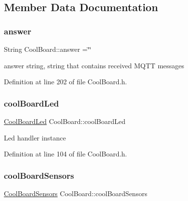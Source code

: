 \subsection{Member Data Documentation}
\mbox{\label{class_cool_board_a7b835fafd449e5282f7f91d787a2dc15}} 
\subsubsection{\texorpdfstring{answer}{answer}}
{\footnotesize\ttfamily String Cool\+Board\+::answer =\char`\"{}\char`\"{}\hspace{0.3cm}{\ttfamily [private]}}

answer string, string that contains received M\+Q\+TT messages 

Definition at line 202 of file Cool\+Board.\+h.

\mbox{\label{class_cool_board_a1b1d3c684a5baa56b08486e192fd8e97}} 
\subsubsection{\texorpdfstring{cool\+Board\+Led}{coolBoardLed}}
{\footnotesize\ttfamily \hyperlink{class_cool_board_led}{Cool\+Board\+Led} Cool\+Board\+::cool\+Board\+Led\hspace{0.3cm}{\ttfamily [private]}}

Led handler instance 

Definition at line 104 of file Cool\+Board.\+h.

\mbox{\label{class_cool_board_af102be5288bd7f7a8e59b13f86e26a00}} 
\subsubsection{\texorpdfstring{cool\+Board\+Sensors}{coolBoardSensors}}
{\footnotesize\ttfamily \hyperlink{class_cool_board_sensors}{Cool\+Board\+Sensors} Cool\+Board\+::cool\+Board\+Sensors\hspace{0.3cm}{\ttfamily [private]}}

